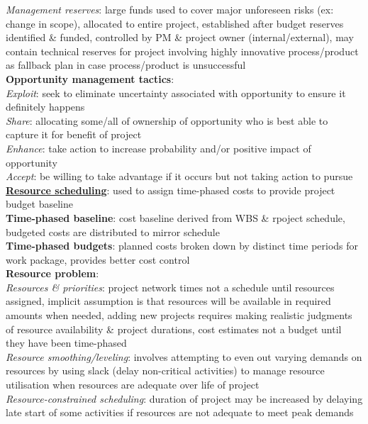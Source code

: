 \documentclass[a4paper]{article}
\begin{document}
\begin{multicols}{3}
        \textit{Management reserves}: large funds used to cover major unforeseen risks (ex: change in scope), allocated to entire project, established after budget reserves identified \& funded, controlled by PM \& project owner (internal/external), may contain technical reserves for project involving highly innovative process/product as fallback plan in case process/product is unsuccessful\\
        \textbf{Opportunity management tactics}:\\
        \textit{Exploit}: seek to eliminate uncertainty associated with opportunity to ensure it definitely happens\\
        \textit{Share}: allocating some/all of ownership of opportunity who is best able to capture it for benefit of project\\
        \textit{Enhance}: take action to increase probability and/or positive impact of opportunity\\
        \textit{Accept}: be willing to take advantage if it occurs but not taking action to pursue\\
        \underline{\textbf{Resource scheduling}}: used to assign time-phased costs to provide project budget baseline\\
        \textbf{Time-phased baseline}: cost baseline derived from WBS \& rpoject schedule, budgeted costs are distributed to mirror schedule\\
        \textbf{Time-phased budgets}: planned costs broken down by distinct time periods for work package, provides better cost control\\
        \textbf{Resource problem}:\\
        \textit{Resources \& priorities}: project network times not a schedule until resources assigned, implicit assumption is that resources will be available in required amounts when needed, adding new projects requires making realistic judgments of resource availability \& project durations, cost estimates not a budget until they have been time-phased\\
        \textit{Resource smoothing/leveling}: involves attempting to even out varying demands on resources by using slack (delay non-critical activities) to manage resource utilisation when resources are adequate over life of project\\
        \textit{Resource-constrained scheduling}: duration of project may be increased by delaying late start of some activities if resources are not adequate to meet peak demands\\

\end{multicols}
\end{document}
